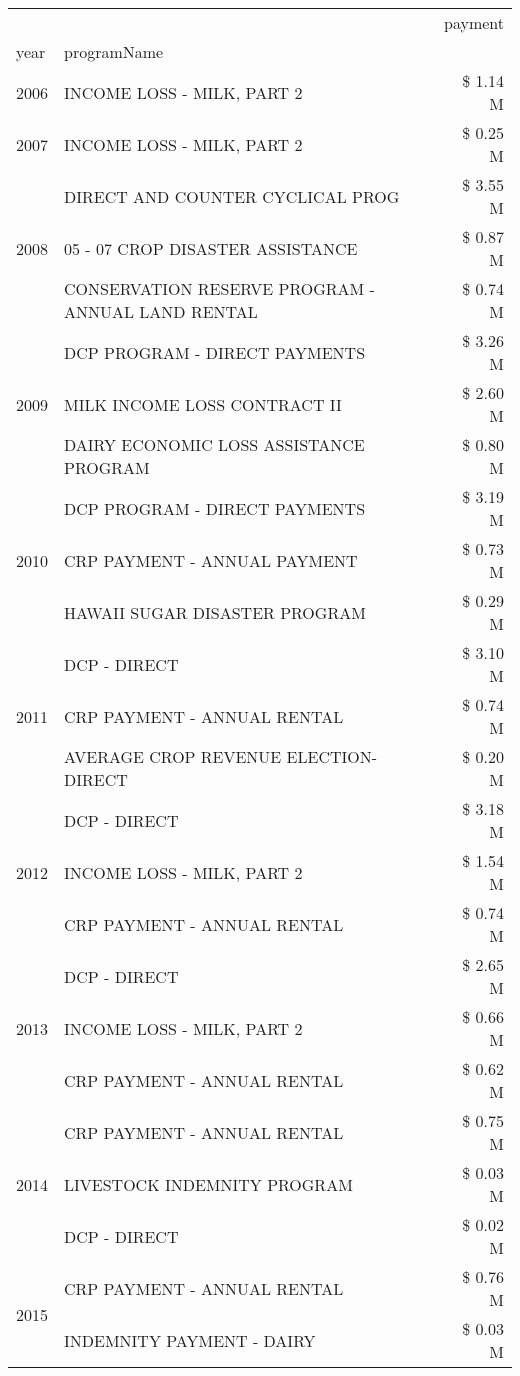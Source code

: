 \begin{tabular}{llr}
\toprule
 &  & payment \\
year & programName &  \\
\midrule
2006 & INCOME LOSS - MILK, PART 2 & \$ 1.14 M \\
\cline{1-3}
2007 & INCOME LOSS - MILK, PART 2 & \$ 0.25 M \\
\cline{1-3}
\multirow[t]{3}{*}{2008} & DIRECT AND COUNTER CYCLICAL PROG & \$ 3.55 M \\
 & 05 - 07 CROP DISASTER ASSISTANCE & \$ 0.87 M \\
 & CONSERVATION RESERVE PROGRAM - ANNUAL LAND RENTAL & \$ 0.74 M \\
\cline{1-3}
\multirow[t]{3}{*}{2009} & DCP PROGRAM - DIRECT PAYMENTS & \$ 3.26 M \\
 & MILK INCOME LOSS CONTRACT II & \$ 2.60 M \\
 & DAIRY ECONOMIC LOSS ASSISTANCE PROGRAM & \$ 0.80 M \\
\cline{1-3}
\multirow[t]{3}{*}{2010} & DCP PROGRAM - DIRECT PAYMENTS & \$ 3.19 M \\
 & CRP PAYMENT - ANNUAL PAYMENT & \$ 0.73 M \\
 & HAWAII SUGAR DISASTER PROGRAM & \$ 0.29 M \\
\cline{1-3}
\multirow[t]{3}{*}{2011} & DCP - DIRECT & \$ 3.10 M \\
 & CRP PAYMENT - ANNUAL RENTAL & \$ 0.74 M \\
 & AVERAGE CROP REVENUE ELECTION-DIRECT & \$ 0.20 M \\
\cline{1-3}
\multirow[t]{3}{*}{2012} & DCP - DIRECT & \$ 3.18 M \\
 & INCOME LOSS - MILK, PART 2 & \$ 1.54 M \\
 & CRP PAYMENT - ANNUAL RENTAL & \$ 0.74 M \\
\cline{1-3}
\multirow[t]{3}{*}{2013} & DCP - DIRECT & \$ 2.65 M \\
 & INCOME LOSS - MILK, PART 2 & \$ 0.66 M \\
 & CRP PAYMENT - ANNUAL RENTAL & \$ 0.62 M \\
\cline{1-3}
\multirow[t]{3}{*}{2014} & CRP PAYMENT - ANNUAL RENTAL & \$ 0.75 M \\
 & LIVESTOCK INDEMNITY PROGRAM & \$ 0.03 M \\
 & DCP - DIRECT & \$ 0.02 M \\
\cline{1-3}
\multirow[t]{3}{*}{2015} & CRP PAYMENT - ANNUAL RENTAL & \$ 0.76 M \\
 & INDEMNITY PAYMENT - DAIRY & \$ 0.03 M \\

\end{tabular}
